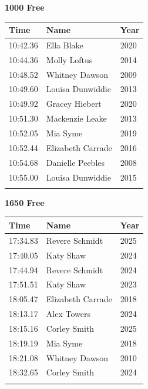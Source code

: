 \vspace{1.2em}
\noindent\begin{minipage}[t]{0.48\textwidth}
\centering
\textbf{\textcolor{teamprimary}{1000 Free}}\par
\vspace{0.5em}
\centering
\small
\renewcommand{\arraystretch}{1.0}
\setlength{\tabcolsep}{4pt}
\begin{tabular}{@{}p{1.8cm}p{3.0cm}p{1.0cm}@{}}
\toprule
\textbf{Time} & \textbf{Name} & \textbf{Year} \\
\midrule
10:42.36 & Ella Blake & 2020 \\
10:44.36 & Molly Loftus & 2014 \\
10:48.52 & Whitney Dawson & 2009 \\
10:49.60 & Louisa Dunwiddie & 2013 \\
10:49.92 & Gracey Hiebert & 2020 \\
10:51.30 & Mackenzie Leake & 2013 \\
10:52.05 & Mia Syme & 2019 \\
10:52.44 & Elizabeth Carrade & 2016 \\
10:54.68 & Danielle Peebles & 2008 \\
10:55.00 & Louisa Dunwiddie & 2015 \\
\bottomrule
\vspace{0.5em}
\end{tabular}
\end{minipage}
\hfill
\begin{minipage}[t]{0.48\textwidth}
\centering
\textbf{\textcolor{teamprimary}{1650 Free}}\par
\vspace{0.5em}
\centering
\small
\renewcommand{\arraystretch}{1.0}
\setlength{\tabcolsep}{4pt}
\begin{tabular}{@{}p{1.8cm}p{3.0cm}p{1.0cm}@{}}
\toprule
\textbf{Time} & \textbf{Name} & \textbf{Year} \\
\midrule
17:34.83 & Revere Schmidt & 2025 \\
17:40.05 & Katy Shaw & 2024 \\
17:44.94 & Revere Schmidt & 2024 \\
17:51.51 & Katy Shaw & 2023 \\
18:05.47 & Elizabeth Carrade & 2018 \\
18:13.17 & Alex Towers & 2024 \\
18:15.16 & Corley Smith & 2025 \\
18:19.19 & Mia Syme & 2018 \\
18:21.08 & Whitney Dawson & 2010 \\
18:32.65 & Corley Smith & 2024 \\
\bottomrule
\vspace{0.5em}
\end{tabular}
\end{minipage}
